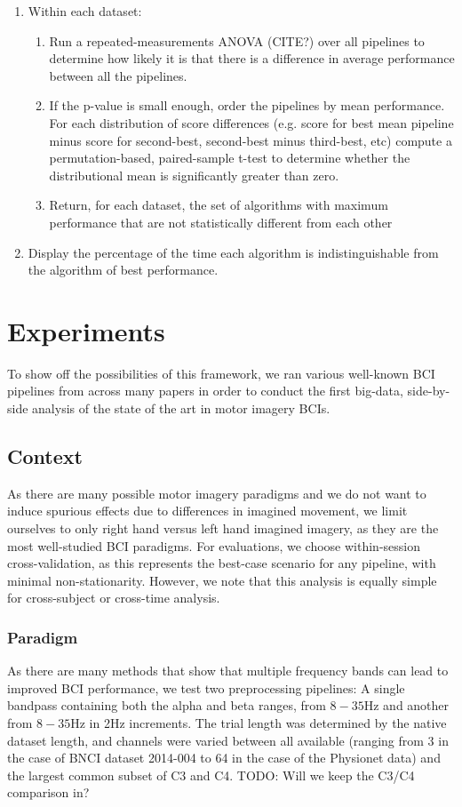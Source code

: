 \begin{enumerate}
\item Within each dataset:
  \begin{enumerate}
  \item Run a repeated-measurements ANOVA (CITE?) over all pipelines to
    determine how likely it is that there is a difference in average performance
    between all the pipelines.
  \item If the p-value is small enough, order the pipelines by mean
    performance. For each distribution of score differences (e.g. score for best
    mean pipeline minus score for second-best, second-best minus third-best,
    etc) compute a permutation-based, paired-sample t-test to
    determine whether the distributional mean is significantly greater than
    zero.
  \item Return, for each dataset, the set of algorithms with maximum performance
    that are not statistically different from each other
  \end{enumerate}
\item Display the percentage of the time each algorithm is indistinguishable
  from the algorithm of best performance.
\end{enumerate}


\section{Experiments}

To show off the possibilities of this framework, we ran various well-known BCI
pipelines from across many papers in order to conduct the first big-data,
side-by-side analysis of the state of the art in motor imagery BCIs.

\subsection{Context}

As there are many possible motor imagery paradigms and we do not want to induce
spurious effects due to differences in imagined movement, we limit ourselves to
only right hand versus left hand imagined imagery, as they are the most
well-studied BCI paradigms\cite{Yuan2014}. For evaluations, we choose
within-session cross-validation, as this represents the best-case scenario for
any pipeline, with minimal non-stationarity. However, we note that this analysis
is equally simple for cross-subject or cross-time analysis.

\subsubsection{Paradigm}
As there are many methods that show that multiple frequency bands can lead to
improved BCI performance\cite{KaiKengAng2008}, we test two preprocessing
pipelines: A single bandpass containing both the alpha and beta ranges, from
$8-35\text{Hz}$ and another from $8-35\text{Hz}$ in 2Hz increments. The trial
length was determined by the native dataset length, and channels were varied
between all available (ranging from 3 in the case of BNCI dataset 2014-004 to 64
in the case of the Physionet data) and the largest common subset of C3 and C4.
TODO: Will we keep the C3/C4 comparison in?

